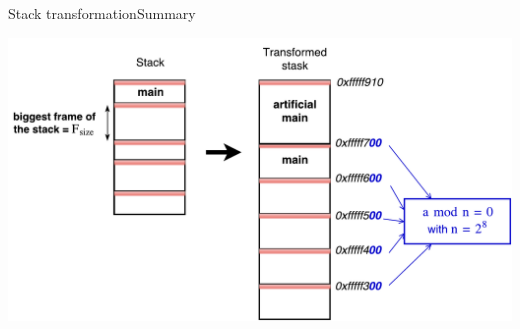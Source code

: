\documentclass{beamer}
\begin{document}
\begin{frame}[c]{Stack transformation}{Summary}
	\begin{center}
   		\includegraphics[width=\textwidth]{images/stack_transfo_final.pdf}
	\end{center}
\end{frame}
%
%
%
%
\end{document}
